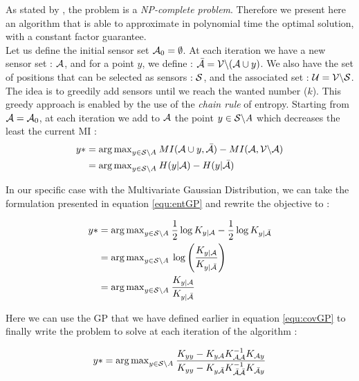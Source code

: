  As stated by \citet{krause_near-optimal_2008}, the problem is a \textit{NP-complete problem}. Therefore we present here an algorithm that is able to approximate in polynomial time the optimal solution, with a constant factor guarantee. \\
 
 Let us define the initial sensor set $\A_0 = \emptyset$. At each iteration we have a new sensor set : $\A$,  and for a point $y$, we define : $\bar{\A} = \V \backslash ( \A \cup y )$. We also have the set of positions that can be selected as sensors : $\S$,  and the associated set : $\U = \V \backslash \S $. \\
 
 
 The idea is to greedily add sensors until we reach the wanted number ($k$).   This greedy approach is enabled by the use of the \textit{chain rule} of entropy.  Starting from $\A = \A_0$, at each iteration we add to $\A$ the point $y \in \S \backslash A $ which decreases the least the current MI : 
\begin{align}
    y* &= {\arg \max}_{y \in \S \backslash A } \: MI(\A \cup y, \bar{\A} ) - MI(\A, \VA) \\
    &= {\arg \max}_{y \in \S \backslash A } \: H(y | \A ) - H(y | \bar{\A} )
\end{align}

In our specific case with the Multivariate Gaussian Distribution, we can take the formulation presented in equation \ref{equ:entGP} and rewrite the objective to : 

\begin{align}
    y*  &= {\arg \max}_{y \in \S \backslash A } \: \frac{1}{2} \log K_{y | \A} - \frac{1}{2} \log K_{y | \bar{\A}} \\
    &= {\arg \max}_{y \in \S \backslash A } \: \log \left(\frac{K_{y | \A}}{K_{y | \bar{\A}}} \right) \\
    &= {\arg \max}_{y \in \S \backslash A } \: \frac{K_{y | \A}}{K_{y | \bar{\A}}}
\end{align}

Here we can use the GP that we have defined earlier in equation \ref{equ:covGP} to finally write the problem to solve at each iteration of the algorithm : 

\begin{equation}
    y*  = {\arg \max}_{y \in \S \backslash A } \: \frac{K_{yy} - K_{y\A} K_{\A\A}^{-1} K_{\A y} }{K_{yy} - K_{y\bar{\A}} K_{\bar{\A}\bar{\A}}^{-1} K_{\bar{\A} y} } \label{equ:updateGreedy}
\end{equation}

